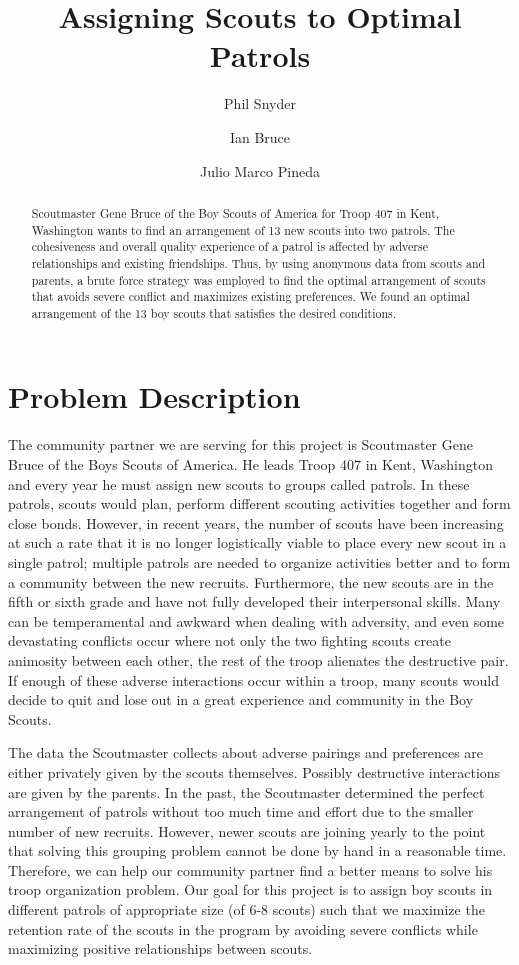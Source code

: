 \documentclass{amsart}
\theoremstyle{definition}
\theoremstyle{remark}
\numberwithin{equation}{section}
\begin{document}
\title{Assigning Scouts to Optimal Patrols}
\author{Phil Snyder}
\author{Ian Bruce}
\author{Julio Marco Pineda}

\begin{abstract}
Scoutmaster Gene Bruce of the Boy Scouts of America for Troop 407 in Kent, Washington wants to find an arrangement of 13 new scouts into two patrols. The cohesiveness and overall quality experience of a patrol is affected by adverse relationships and existing friendships. Thus, by using anonymous data from scouts and parents, a brute force strategy was employed to find the optimal arrangement of scouts that avoids severe conflict and maximizes existing preferences. We found an optimal arrangement of the 13 boy scouts that satisfies the desired conditions.
\end{abstract}
\maketitle
\section*{Problem Description}
The community partner we are serving for this project is Scoutmaster Gene Bruce of the Boys Scouts of America. He leads Troop 407 in Kent, Washington and every year he must assign new scouts to groups called patrols. In these patrols, scouts would plan, perform different scouting activities together and form close bonds. However, in recent years, the number of scouts have been increasing at such a rate that it is no longer logistically viable to place every new scout in a single patrol; multiple patrols are needed to organize activities better and to form a community between the new recruits. Furthermore, the new scouts are in the fifth or sixth grade and have not fully developed their interpersonal skills. Many can be temperamental and awkward when dealing with adversity, and even some devastating conflicts occur where not only the two fighting scouts create animosity between each other, the rest of the troop alienates the destructive pair. If enough of these adverse interactions occur within a troop, many scouts would decide to quit and lose out in a great experience and community in the Boy Scouts.

The data the Scoutmaster collects about adverse pairings and preferences are either privately given by the scouts themselves. Possibly destructive interactions are given by the parents. In the past, the Scoutmaster determined the perfect arrangement of patrols without too much time and effort due to the smaller number of new recruits. However, newer scouts are joining yearly to the point that solving this grouping problem cannot be done by hand in a reasonable time. Therefore, we can help our community partner find a better means to solve his troop organization problem. Our goal for this project is to assign boy scouts in different patrols of appropriate size (of 6-8 scouts) such that we maximize the retention rate of the scouts in the program by avoiding severe conflicts while maximizing positive relationships between scouts.
\end{document}
